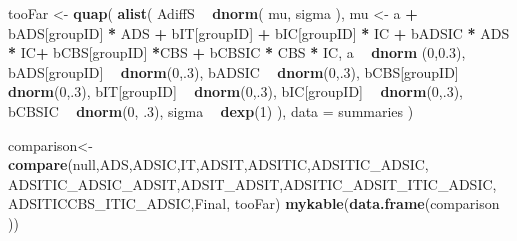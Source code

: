 \documentclass[10pt,dvipsnames,enabledeprecatedfontcommands]{scrartcl}
\newenvironment{Shaded}{\begin{snugshade}}{\end{snugshade}}
\newcommand{\DataTypeTok}[1]{\textcolor[rgb]{0.13,0.29,0.53}{#1}}
\newcommand{\DecValTok}[1]{\textcolor[rgb]{0.00,0.00,0.81}{#1}}
\newcommand{\FloatTok}[1]{\textcolor[rgb]{0.00,0.00,0.81}{#1}}
\newcommand{\KeywordTok}[1]{\textcolor[rgb]{0.13,0.29,0.53}{\textbf{#1}}}
\newcommand{\NormalTok}[1]{#1}
\newcommand{\OperatorTok}[1]{\textcolor[rgb]{0.81,0.36,0.00}{\textbf{#1}}}
\newcommand{\StringTok}[1]{\textcolor[rgb]{0.31,0.60,0.02}{#1}}
\begin{document}
\begin{Shaded}
\begin{Highlighting}[]
\NormalTok{tooFar <-}\StringTok{ }\KeywordTok{quap}\NormalTok{(}
  \KeywordTok{alist}\NormalTok{(}
\NormalTok{    AdiffS }\OperatorTok{~}\StringTok{ }\KeywordTok{dnorm}\NormalTok{( mu, sigma ),}
\NormalTok{    mu <-}\StringTok{ }\NormalTok{a }\OperatorTok{+}\StringTok{ }\NormalTok{bADS[groupID] }\OperatorTok{*}\StringTok{ }\NormalTok{ADS }\OperatorTok{+}\StringTok{  }\NormalTok{bIT[groupID] }\OperatorTok{+}\StringTok{ }\NormalTok{bIC[groupID] }\OperatorTok{*}\StringTok{ }\NormalTok{IC }\OperatorTok{+}\StringTok{ }
\StringTok{      }\NormalTok{bADSIC }\OperatorTok{*}\StringTok{ }\NormalTok{ADS }\OperatorTok{*}\StringTok{ }\NormalTok{IC}\OperatorTok{+}\StringTok{ }\NormalTok{bCBS[groupID] }\OperatorTok{*}\NormalTok{CBS }\OperatorTok{+}\StringTok{ }\NormalTok{bCBSIC }\OperatorTok{*}\StringTok{ }\NormalTok{CBS }\OperatorTok{*}\StringTok{ }\NormalTok{IC, }
\NormalTok{    a }\OperatorTok{~}\StringTok{ }\KeywordTok{dnorm}\NormalTok{ (}\DecValTok{0}\NormalTok{,}\FloatTok{0.3}\NormalTok{),}
\NormalTok{    bADS[groupID] }\OperatorTok{~}\StringTok{ }\KeywordTok{dnorm}\NormalTok{(}\DecValTok{0}\NormalTok{,.}\DecValTok{3}\NormalTok{),}
\NormalTok{    bADSIC }\OperatorTok{~}\StringTok{ }\KeywordTok{dnorm}\NormalTok{(}\DecValTok{0}\NormalTok{,.}\DecValTok{3}\NormalTok{),}
\NormalTok{    bCBS[groupID] }\OperatorTok{~}\StringTok{ }\KeywordTok{dnorm}\NormalTok{(}\DecValTok{0}\NormalTok{,.}\DecValTok{3}\NormalTok{),}
\NormalTok{    bIT[groupID] }\OperatorTok{~}\StringTok{ }\KeywordTok{dnorm}\NormalTok{(}\DecValTok{0}\NormalTok{,.}\DecValTok{3}\NormalTok{),}
\NormalTok{    bIC[groupID] }\OperatorTok{~}\StringTok{ }\KeywordTok{dnorm}\NormalTok{(}\DecValTok{0}\NormalTok{,.}\DecValTok{3}\NormalTok{),}
\NormalTok{     bCBSIC }\OperatorTok{~}\StringTok{ }\KeywordTok{dnorm}\NormalTok{(}\DecValTok{0}\NormalTok{, }\FloatTok{.3}\NormalTok{),}
\NormalTok{    sigma  }\OperatorTok{~}\StringTok{ }\KeywordTok{dexp}\NormalTok{(}\DecValTok{1}\NormalTok{)}
\NormalTok{  ), }
  \DataTypeTok{data =}\NormalTok{ summaries}
\NormalTok{)}
\end{Highlighting}
\end{Shaded}

\normalsize

\vspace{1mm}
\footnotesize

\begin{Shaded}
\begin{Highlighting}[]
\NormalTok{comparison<-}\StringTok{ }\KeywordTok{compare}\NormalTok{(null,ADS,ADSIC,IT,ADSIT,ADSITIC,ADSITIC_ADSIC,}
\NormalTok{                     ADSITIC_ADSIC_ADSIT,ADSIT_ADSIT,ADSITIC_ADSIT_ITIC_ADSIC,}
\NormalTok{                     ADSITICCBS_ITIC_ADSIC,Final, tooFar)}
\KeywordTok{mykable}\NormalTok{(}\KeywordTok{data.frame}\NormalTok{(comparison )) }
\end{Highlighting}
\end{Shaded}
\end{document}
